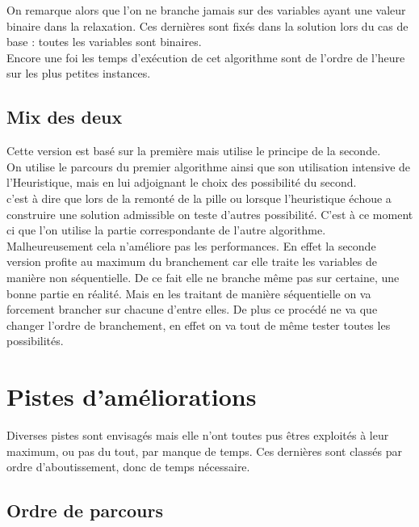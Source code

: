 \documentclass[12pt,a4paper]{article}
\begin{document}
On remarque alors que l'on ne branche jamais sur des variables ayant une valeur binaire dans la relaxation. Ces dernières sont fixés dans la solution lors du cas de base : toutes les variables sont binaires.\\

Encore une foi les temps d’exécution de cet algorithme sont de l'ordre de l'heure sur les plus petites instances.\\

\subsection{Mix des deux}

Cette version est basé sur la première mais utilise le principe de la seconde.\\

On utilise le parcours du premier algorithme ainsi que son utilisation intensive de l'Heuristique, mais en lui adjoignant le choix des possibilité du second.\\

c'est à dire que lors de la remonté de la pille ou lorsque l'heuristique échoue a construire une solution admissible on teste d'autres possibilité. C'est à ce moment ci que l'on utilise la partie correspondante de l'autre algorithme.\\

Malheureusement cela n'améliore pas les performances. En effet la seconde version profite au maximum du branchement car elle traite les variables de manière non séquentielle. De ce fait elle ne branche même pas sur certaine, une bonne partie en réalité. Mais en les traitant de manière séquentielle on va forcement brancher sur chacune d'entre elles. De plus ce procédé ne va que changer l'ordre de branchement, en effet on va tout de même tester toutes les possibilités.

\section{Pistes d'améliorations}

Diverses pistes sont envisagés mais elle n'ont toutes pus êtres exploités à leur maximum, ou pas du tout, par manque de temps. Ces dernières sont classés par ordre d'aboutissement, donc de temps nécessaire.

\subsection{Ordre de parcours}
\end{document}

